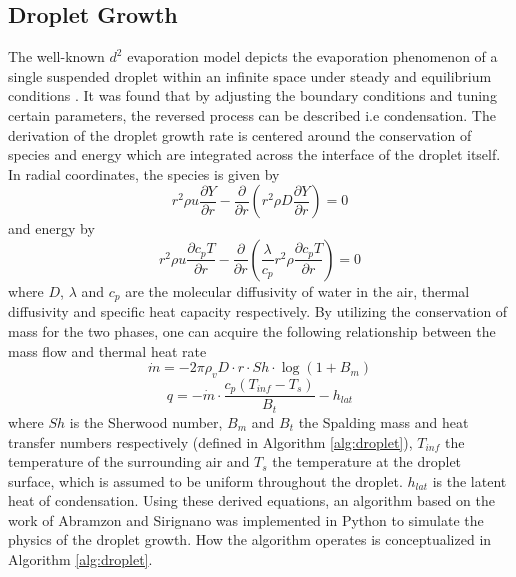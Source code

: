 \documentclass[12pt]{article}
\begin{document}
\subsection{Droplet Growth}\label{s:droplet}
The well-known $d^2$ evaporation model depicts the evaporation phenomenon of a single suspended droplet within an infinite space under steady and equilibrium conditions \cite{turns2011introduction}. It was found that by adjusting the boundary conditions and tuning certain parameters, the reversed process can be described i.e condensation. 
The derivation of the droplet growth rate is centered around the conservation of species and energy which are integrated across the interface of the droplet itself. In radial coordinates, the species is given by
\begin{equation}
    r^{2}\rho u \frac{\partial Y}{\partial r}-\frac{\partial}{\partial r}\left(r^{2} \rho D \frac{\partial Y}{\partial r}\right) =0
\end{equation}
and energy by
\begin{equation}
    r^{2}\rho u \frac{\partial c_{p}T}{\partial r}-\frac{\partial}{\partial r}\left(\frac{\lambda}{c_{p}}r^{2} \rho  \frac{\partial c_{p}T}{\partial r}\right) =0
\end{equation}
where $D$, $\lambda$ and $c_{p}$ are the molecular diffusivity of water in the air, thermal diffusivity and specific heat capacity respectively. 
By utilizing the conservation of mass for the two phases, one can acquire the following relationship between the mass flow and thermal heat rate
\begin{equation}
    \dot{m}=-2\pi\rho_{v}D\cdot r \cdot Sh\cdot \log(1+B_{m})
\end{equation}
\begin{equation}
    q=-\dot{m}\cdot \frac{c_{p}(T_{inf}-T_{s})}{B_{t}}-h_{lat}
\end{equation}
where $Sh$ is the Sherwood number, $B_{m}$ and $B_{t}$ the Spalding mass and heat transfer numbers respectively (defined in Algorithm \ref{alg:droplet}), $T_{inf}$ the temperature of the surrounding air and $T_{s}$ the temperature at the droplet surface, which is assumed to be uniform throughout the droplet. $h_{lat}$ is the latent heat of condensation. Using these derived equations, an algorithm based on the work of Abramzon and Sirignano \cite{abramzon1989droplet} was implemented in Python to simulate the physics of the droplet growth. How the algorithm operates is conceptualized in Algorithm \ref{alg:droplet}. 
\end{document}
